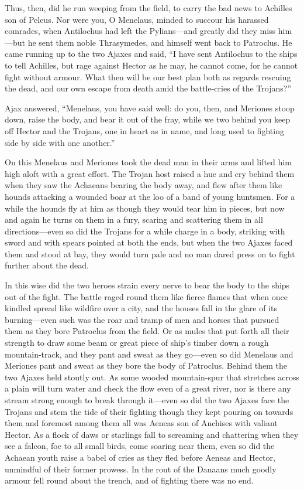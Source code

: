 Thus, then, did he run weeping from the field, to carry the bad news to
Achilles son of Peleus. Nor were you, O Menelaus, minded to succour his
harassed comrades, when Antilochus had left the Pylians—and greatly
did they miss him—but he sent them noble Thrasymedes, and himself
went back to Patroclus. He came running up to the two Ajaxes and said, “I
have sent Antilochus to the ships to tell Achilles, but rage against
Hector as he may, he cannot come, for he cannot fight without armour. What
then will be our best plan both as regards rescuing the dead, and our own
escape from death amid the battle-cries of the Trojans?”

Ajax answered, “Menelaus, you have said well: do you, then, and Meriones
stoop down, raise the body, and bear it out of the fray, while we two
behind you keep off Hector and the Trojans, one in heart as in name, and
long used to fighting side by side with one another.”

On this Menelaus and Meriones took the dead man in their arms and lifted
him high aloft with a great effort. The Trojan host raised a hue and cry
behind them when they saw the Achaeans bearing the body away, and flew
after them like hounds attacking a wounded boar at the loo of a band of
young huntsmen. For a while the hounds fly at him as though they would
tear him in pieces, but now and again he turns on them in a fury, scaring
and scattering them in all directions—even so did the Trojans for a
while charge in a body, striking with sword and with spears pointed at
both the ends, but when the two Ajaxes faced them and stood at bay, they
would turn pale and no man dared press on to fight further about the dead.

In this wise did the two heroes strain every nerve to bear the body to the
ships out of the fight. The battle raged round them like fierce flames
that when once kindled spread like wildfire over a city, and the houses
fall in the glare of its burning—even such was the roar and tramp of
men and horses that pursued them as they bore Patroclus from the field. Or
as mules that put forth all their strength to draw some beam or great
piece of ship’s timber down a rough mountain-track, and they pant and
sweat as they go—even so did Menelaus and Meriones pant and sweat as they
bore the body of Patroclus. Behind them the two Ajaxes held stoutly out.
As some wooded mountain-spur that stretches across a plain will turn water
and check the flow even of a great river, nor is there any stream strong
enough to break through it—even so did the two Ajaxes face the
Trojans and stem the tide of their fighting though they kept pouring on
towards them and foremost among them all was Aeneas son of Anchises with
valiant Hector. As a flock of daws or starlings fall to screaming and
chattering when they see a falcon, foe to all small birds, come soaring
near them, even so did the Achaean youth raise a babel of cries as they
fled before Aeneas and Hector, unmindful of their former prowess. In the
rout of the Danaans much goodly armour fell round about the trench, and of
fighting there was no end.

